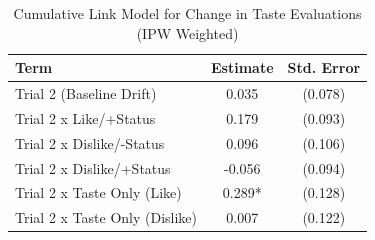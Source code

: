 \begin{table}[ht!]
\centering
\caption{Cumulative Link Model for Change in Taste Evaluations (IPW Weighted)}
\label{tab:clm}
\begin{tabular}{lcc}
\hline
\hline
Term & Estimate & Std. Error \\
\hline
Trial 2 (Baseline Drift) & 0.035 & (0.078) \\
Trial 2 x Like/+Status & 0.179 & (0.093) \\
Trial 2 x Dislike/-Status & 0.096 & (0.106) \\
Trial 2 x Dislike/+Status & -0.056 & (0.094) \\
Trial 2 x Taste Only (Like) & 0.289* & (0.128) \\
Trial 2 x Taste Only (Dislike) & 0.007 & (0.122) \\
\hline
\end{tabular}
\end{table}
